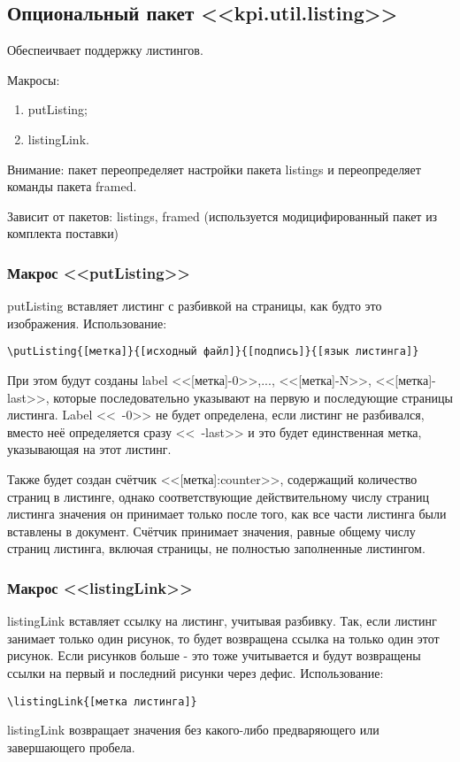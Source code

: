\subsection{Опциональный пакет <<kpi.util.listing>>}
Обеспеичвает поддержку листингов.\par
Макросы:
\begin{enumerate}
\item putListing;
\item listingLink.
\end{enumerate}\par
Внимание: пакет переопределяет настройки пакета listings и переопределяет команды пакета framed.\par
Зависит от пакетов: listings, framed (используется модицифированный пакет из комплекта поставки)
\subsubsection{Макрос <<putListing>>}
putListing вставляет листинг с разбивкой на страницы, как будто это изображения.
Использование:{\small
\begin{verbatim}
\putListing{[метка]}{[исходный файл]}{[подпись]}{[язык листинга]}
\end{verbatim}}
\normalsize
При этом будут созданы label <<[метка]-0>>,..., <<[метка]-N>>, <<[метка]-last>>, которые последовательно указывают на первую и последующие страницы листинга. Label <<~-0>> не будет определена, если листинг не разбивался, вместо неё определяется сразу <<~-last>> и это будет единственная метка, указывающая на этот листинг.\par
Также будет создан счётчик <<[метка]:counter>>, содержащий количество страниц в листинге, однако соответствующие действительному числу страниц листинга значения он принимает только после того, как все части листинга были вставлены в документ. Счётчик принимает значения, равные общему числу страниц листинга, включая страницы, не полностью заполненные листингом.

\subsubsection{Макрос <<listingLink>>}
listingLink вставляет ссылку на листинг, учитывая разбивку. Так, если листинг занимает только один рисунок, то будет возвращена ссылка на только один этот рисунок. Если рисунков больше - это тоже учитывается и будут возвращены ссылки на первый и последний рисунки через дефис.
Использование:{\small
\begin{verbatim}
\listingLink{[метка листинга]}
\end{verbatim}}
\normalsize
listingLink возвращает значения без какого-либо предваряющего или завершающего пробела.

